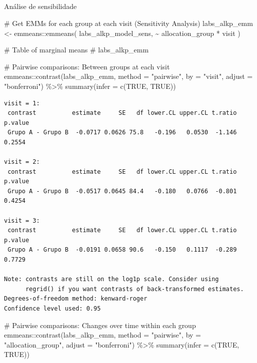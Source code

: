 \documentclass[
  12pt,
]{article}
\makeatletter
\let\oldsubparagraph\subparagraph
\renewcommand{\subparagraph}{
    \@ifstar
      \xxxSubParagraphStar
      \xxxSubParagraphNoStar
  }
\newcommand{\xxxSubParagraphStar}[1]{\oldsubparagraph*{#1}\mbox{}}
\newcommand{\xxxSubParagraphNoStar}[1]{\oldsubparagraph{#1}\mbox{}}
\newenvironment{Shaded}{\begin{snugshade}}{\end{snugshade}}
\newcommand{\AttributeTok}[1]{\textcolor[rgb]{0.40,0.45,0.13}{#1}}
\newcommand{\CommentTok}[1]{\textcolor[rgb]{0.37,0.37,0.37}{#1}}
\newcommand{\ConstantTok}[1]{\textcolor[rgb]{0.56,0.35,0.01}{#1}}
\newcommand{\FunctionTok}[1]{\textcolor[rgb]{0.28,0.35,0.67}{#1}}
\newcommand{\NormalTok}[1]{\textcolor[rgb]{0.00,0.23,0.31}{#1}}
\newcommand{\OtherTok}[1]{\textcolor[rgb]{0.00,0.23,0.31}{#1}}
\newcommand{\SpecialCharTok}[1]{\textcolor[rgb]{0.37,0.37,0.37}{#1}}
\newcommand{\StringTok}[1]{\textcolor[rgb]{0.13,0.47,0.30}{#1}}
\makeatother
\begin{document}
\subparagraph{Análise de
sensibilidade}\label{anuxe1lise-de-sensibilidade-3}

\begin{Shaded}
\begin{Highlighting}[]
\CommentTok{\# Get EMMs for each group at each visit (Sensitivity Analysis)}
\NormalTok{labs\_alkp\_emm }\OtherTok{\textless{}{-}}\NormalTok{ emmeans}\SpecialCharTok{::}\FunctionTok{emmeans}\NormalTok{(}
\NormalTok{    labs\_alkp\_model\_sens, }
    \SpecialCharTok{\textasciitilde{}}\NormalTok{ allocation\_group }\SpecialCharTok{*}\NormalTok{ visit}
\NormalTok{)}

\CommentTok{\# Table of marginal means}
\CommentTok{\# labs\_alkp\_emm}

\CommentTok{\# Pairwise comparisons: Between groups at each visit}
\NormalTok{emmeans}\SpecialCharTok{::}\FunctionTok{contrast}\NormalTok{(labs\_alkp\_emm,}
\AttributeTok{method =} \StringTok{"pairwise"}\NormalTok{, }\AttributeTok{by =} \StringTok{"visit"}\NormalTok{,}
\AttributeTok{adjust =} \StringTok{"bonferroni"}\NormalTok{) }\SpecialCharTok{\%\textgreater{}\%} \FunctionTok{summary}\NormalTok{(}\AttributeTok{infer =} \FunctionTok{c}\NormalTok{(}\ConstantTok{TRUE}\NormalTok{, }\ConstantTok{TRUE}\NormalTok{))}
\end{Highlighting}
\end{Shaded}

\begin{verbatim}
visit = 1:
 contrast          estimate     SE   df lower.CL upper.CL t.ratio p.value
 Grupo A - Grupo B  -0.0717 0.0626 75.8   -0.196   0.0530  -1.146  0.2554

visit = 2:
 contrast          estimate     SE   df lower.CL upper.CL t.ratio p.value
 Grupo A - Grupo B  -0.0517 0.0645 84.4   -0.180   0.0766  -0.801  0.4254

visit = 3:
 contrast          estimate     SE   df lower.CL upper.CL t.ratio p.value
 Grupo A - Grupo B  -0.0191 0.0658 90.6   -0.150   0.1117  -0.289  0.7729

Note: contrasts are still on the log1p scale. Consider using
      regrid() if you want contrasts of back-transformed estimates. 
Degrees-of-freedom method: kenward-roger 
Confidence level used: 0.95 
\end{verbatim}

\begin{Shaded}
\begin{Highlighting}[]
\CommentTok{\# Pairwise comparisons: Changes over time within each group}
\NormalTok{emmeans}\SpecialCharTok{::}\FunctionTok{contrast}\NormalTok{(labs\_alkp\_emm,}
\AttributeTok{method =} \StringTok{"pairwise"}\NormalTok{, }\AttributeTok{by =} \StringTok{"allocation\_group"}\NormalTok{,}
\AttributeTok{adjust =} \StringTok{"bonferroni"}\NormalTok{) }\SpecialCharTok{\%\textgreater{}\%} \FunctionTok{summary}\NormalTok{(}\AttributeTok{infer =} \FunctionTok{c}\NormalTok{(}\ConstantTok{TRUE}\NormalTok{, }\ConstantTok{TRUE}\NormalTok{))}
\end{Highlighting}
\end{Shaded}
\end{document}
